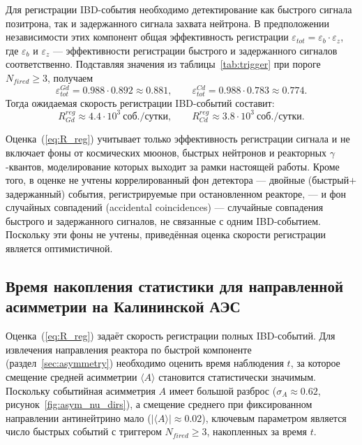 \documentclass[a4paper,12pt]{extarticle}
\begin{document}
Для регистрации IBD-события необходимо детектирование как быстрого сигнала позитрона, так и задержанного сигнала захвата нейтрона. В предположении независимости этих компонент общая эффективность регистрации $\varepsilon_{tot}=\varepsilon_{b}\cdot\varepsilon_{z}$, где $\varepsilon_{b}$ и $\varepsilon_{z}$ --- эффективности регистрации быстрого и задержанного сигналов соответственно. Подставляя значения из таблицы~\ref{tab:trigger} при пороге $N_{fired}\ge 3$, получаем
\begin{equation}
    \varepsilon_{tot}^{Gd}=0.988\cdot 0.892\approx 0.881,\qquad
    \varepsilon_{tot}^{Cd}=0.988\cdot 0.783\approx 0.774.
\end{equation}
Тогда ожидаемая скорость регистрации IBD-событий составит:
\begin{equation}
    R^{reg}_{Gd}\approx 4.4\cdot 10^{3}~\text{соб./сутки},\qquad
    R^{reg}_{Cd}\approx 3.8\cdot 10^{3}~\text{соб./сутки}.
    \label{eq:R_reg}
\end{equation}

Оценка~(\ref{eq:R_reg}) учитывает только эффективность регистрации сигнала и не включает фоны от космических мюонов, быстрых нейтронов и реакторных $\gamma$-квантов, моделирование которых выходит за рамки настоящей работы. Кроме того, в оценке не учтены коррелированный фон детектора --- двойные (быстрый$+$задержанный) события, регистрируемые при остановленном реакторе, --- и фон случайных совпадений (accidental coincidences) --- случайные совпадения быстрого и задержанного сигналов, не связанные с одним IBD-событием. Поскольку эти фоны не учтены, приведённая оценка скорости регистрации является оптимистичной.

\subsection{Время накопления статистики для направленной асимметрии на Калининской АЭС}
\label{sec:asym_time}

Оценка~(\ref{eq:R_reg}) задаёт скорость регистрации полных IBD-событий. Для извлечения направления реактора по быстрой компоненте (раздел~\ref{sec:asymmetry}) необходимо оценить время наблюдения $t$, за которое смещение средней асимметрии $\langle A\rangle$ становится статистически значимым. Поскольку событийная асимметрия $A$ имеет большой разброс ($\sigma_A\approx 0.62$, рисунок~\ref{fig:asym_nu_dirs}), а смещение среднего при фиксированном направлении антинейтрино мало ($|\langle A\rangle|\approx 0.02$), ключевым параметром является число быстрых событий с триггером $N_{fired}\ge 3$, накопленных за время $t$.
\end{document}
